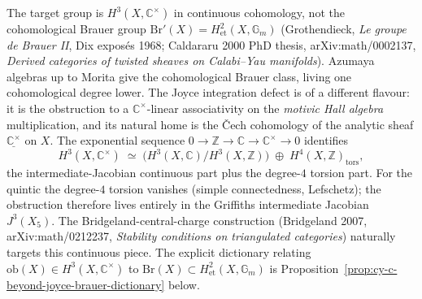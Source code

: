 \begin{remark}
\label{rem:cy-c-beyond-why-H3-Cx}
The target group is $H^3(X, \mathbb{C}^\times)$ in continuous cohomology, not the
cohomological Brauer group $\mathrm{Br}'(X) = H^2_{\mathrm{et}}(X, \mathbb{G}_m)$
(Grothendieck, \emph{Le groupe de Brauer II}, Dix exposés 1968; Caldararu 2000
PhD thesis, arXiv:math/0002137, \emph{Derived categories of twisted sheaves on
Calabi--Yau manifolds}). Azumaya algebras up to Morita give the cohomological
Brauer class, living one cohomological degree lower. The Joyce integration
defect is of a different flavour: it is the obstruction to a
$\mathbb{C}^\times$-linear associativity on the \emph{motivic Hall algebra}
multiplication, and its natural home is the \v{C}ech cohomology of the analytic
sheaf $\underline{\mathbb{C}^\times}$ on $X$. The exponential sequence
$0 \to \mathbb{Z} \to \mathbb{C} \to \mathbb{C}^\times \to 0$ identifies
\[
 H^3(X, \mathbb{C}^\times) \;\simeq\; \bigl( H^3(X, \mathbb{C}) / H^3(X, \mathbb{Z}) \bigr)
 \;\oplus\; H^4(X, \mathbb{Z})_{\mathrm{tors}},
\]
the intermediate-Jacobian continuous part plus the degree-$4$ torsion part. For
the quintic the degree-$4$ torsion vanishes (simple connectedness,
Lefschetz); the obstruction therefore lives entirely in the Griffiths
intermediate Jacobian $J^3(X_5)$. The Bridgeland-central-charge construction
(Bridgeland 2007, arXiv:math/0212237, \emph{Stability conditions on triangulated
categories}) naturally targets this continuous piece. The explicit dictionary
relating $\mathrm{ob}(X) \in H^3(X, \mathbb{C}^\times)$ to
$\mathrm{Br}(X) \subset H^2_{\mathrm{et}}(X, \mathbb{G}_m)$ is
Proposition~\ref{prop:cy-c-beyond-joyce-brauer-dictionary} below.
\end{remark}

